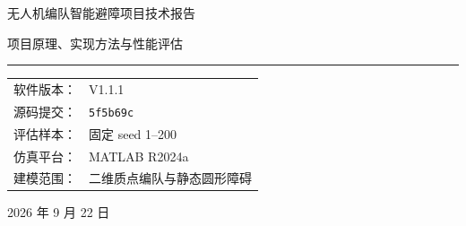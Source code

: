 \documentclass[UTF8,a4paper,12pt,fontset=windows]{ctexart}
\newcommand{\code}[1]{\texttt{#1}}
\begin{document}
\begin{titlepage}
  \thispagestyle{empty}
  \centering
  \vspace*{3.1cm}
  {\heiti{} 无人机编队智能避障项目技术报告\par}
  \vspace{1.1cm}
  {\songti{} 项目原理、实现方法与性能评估\par}
  \vspace{2.3cm}
  \rule{0.72\textwidth}{0.5pt}\par
  \vspace{1.2cm}
  \begin{tabular}{@{}rl@{}}
    软件版本： & V1.1.1 \\
    源码提交： & \code{5f5b69c} \\
    评估样本： & 固定 seed 1--200 \\
    仿真平台： & MATLAB R2024a \\
    建模范围： & 二维质点编队与静态圆形障碍 \\
  \end{tabular}
  \vfill
  { 2026 年 9 月 22 日\par}
\end{titlepage}


\begin{abstract}
本项目研究五架无人机在二维随机静态障碍环境中的编队避障问题。系统采用领航--跟随结构：长机利用膨胀栅格路径规划与改进人工势场完成导航，僚机沿长机历史轨迹跟随，并在终端恢复固定 V 形；Actor--Critic 自适应动态规划提供在线加速度修正，预测式安全层负责连续扫掠避碰。当前版本最大速度为 \SI{4.5}{m/s}，长机规划净空为 \SI{4.2}{m}。

本报告直接基于 F 盘 V1.1.1 源码重新运行 seed 1--200。共 197 个 seed 成功、2 个碰撞、1 个超时，样本成功率为 98.5\%，Wilson 95\% 区间为 95.68\%--99.49\%。成功样本平均完成时间为 \SI{28.74}{s}，长机平均路径为 \SI{87.72}{m}，相对 \SI{79.40}{m} 直线距离增加 10.5\%。成功 seed 的最后 \SI{1}{s} 队形误差 RMS 均值为 \SI{0.062}{m}，但巡航阶段达到 \SI{8.59}{m}，说明当前系统能在终点准确归队，却没有在全航程严格保持几何 V 形。

局部线性分析表明，在无障碍、未饱和、参考固定且 ADP 修正冻结的条件下，僚机编队 PD 子系统与长机保持子系统均为 Hurwitz 稳定。完整系统包含势场、输入限幅、航点与模式切换、非光滑安全修正和在线学习，因此现阶段只能报告局部稳定性与样本收敛证据，不能宣称全局渐近稳定。

\noindent\textbf{关键词：}无人机编队；人工势场；自适应动态规划；路径规划；避碰；闭环稳定性
\end{abstract}
\end{document}
